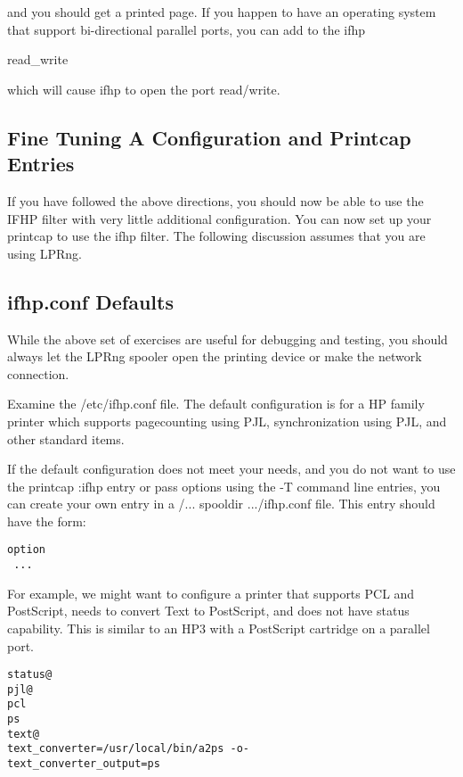 \documentclass[a4paper]{article}
\begin{document}
\begin{enumerate}
and you should get a printed page.
If you happen to have an operating system that support bi-directional
parallel ports, you can add to the ifhp
\begin{tscreen}
read\_write
\end{tscreen}

which will cause ifhp to open the port read/write.



\end{enumerate}



\subsection{Fine Tuning A Configuration and Printcap Entries
\label{finetune}}

If you have followed the above directions,
you should now be able to use the IFHP filter with
very little additional configuration.
You can now set up your printcap to use the
{\ttfamily ifhp} filter.
The following discussion assumes that you are using LPRng.


\subsection{ifhp.conf Defaults}

While the above set of exercises are useful for debugging
and testing,
you should always let the LPRng spooler open the printing device
or make the network connection.

Examine the
{\ttfamily /etc/ifhp.conf}
file.
The default configuration is for a HP family printer
which supports pagecounting using PJL,
synchronization using PJL,
and other standard items.

If the default configuration does not meet your needs,
and you do not want to use the printcap
{\ttfamily :ifhp}
entry
or pass options using the
{\ttfamily -T}
command line entries,
you can create your own entry in a
{\ttfamily /... spooldir .../ifhp.conf}
file.
This entry should have the form:
\begin{tscreen}
\begin{verbatim}
option
 ...
\end{verbatim}
\end{tscreen}


For example,
we might want to configure a printer that supports PCL and PostScript,
needs to convert Text to PostScript,
and does not have status capability.
This is similar to an HP3 with a PostScript cartridge on a parallel port.
\begin{tscreen}
\begin{verbatim}
status@
pjl@
pcl
ps
text@
text_converter=/usr/local/bin/a2ps -o-
text_converter_output=ps
\end{verbatim}
\end{tscreen}
\end{document}
